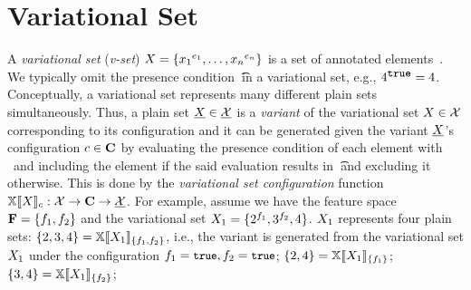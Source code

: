 \section{Variational Set}
\label{sec:vset}




A \emph{variational set} (\emph{v-set}) $\vset = \setDef {\annot [\dimMeta_1] {\elem_1},\ldots, \annot [\dimMeta_n] {\elem_n}}$ 
is a set of annotated elements~\cite{EWC13fosd,Walk14onward,ATW17dbpl}.
We typically omit the presence condition \t\ in a variational set,
e.g., $\annot [\t] 4 = 4$.
%
Conceptually, a variational set represents many different plain sets simultaneously.
Thus, a plain set $\pset \in \psetSet$  
is a \emph{variant} of the variational set $\vset \in \vsetSet$ corresponding to its configuration
and it can be generated given the variant $\pset$'s configuration $\config \in \confSet$
by evaluating the presence condition of each element with \config\
and including the element if the said evaluation results in \t\ and excluding it otherwise.
This is done by the \emph{variational set configuration} function
\ensuremath{\osetSem \vset: \vsetSet \to \confSet \to \psetSet}.
For example, 
assume we have the feature space $\fSet = \setDef {\A, \B}$ 
and the variational set $\vset_1 = \setDef {\annot [\A] 2, \annot [\B] 3, 4}$.
$\vset_1$ represents four plain sets:
\ensuremath{  = \osetSem [\setDef {\A, \B}] {\vset_1}}, i.e., the variant 
 \setDef {2,3,4} is generated from the variational set $\vset_1$ under the configuration \ensuremath{\A = \t, \B = \t};
\ensuremath{ \setDef {2,4} = \osetSem [\setDef {\A}] {\vset_1}};
\ensuremath{ \setDef {3,4} = \osetSem [\setDef {\B}] {\vset_1}};
